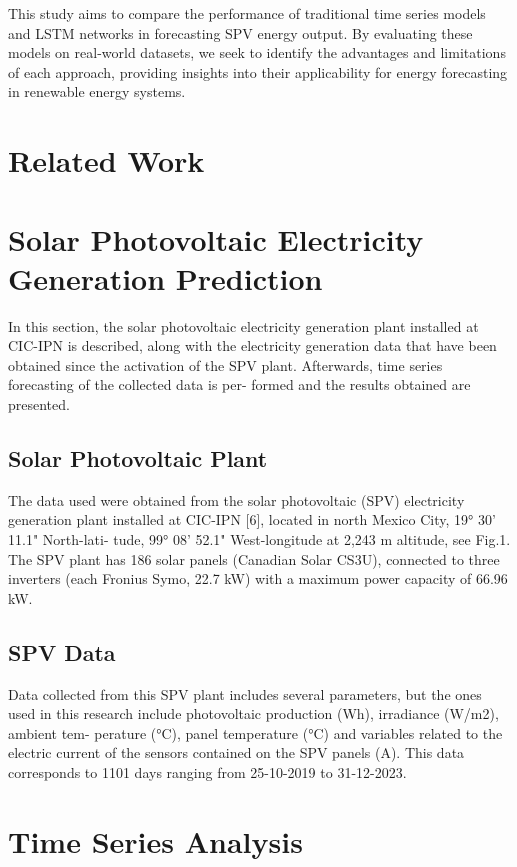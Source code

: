 \documentclass[a4paper,12pt]{article}
\begin{document}
This study aims to compare the performance of traditional time series models and LSTM networks in forecasting SPV energy output. By evaluating these models on real-world datasets, we seek to identify the advantages and limitations of each approach, providing insights into their applicability for energy forecasting in renewable energy systems.

\section{Related Work}

\section{Solar Photovoltaic Electricity Generation Prediction}
In this section, the solar photovoltaic electricity generation plant installed at CIC-IPN
is described, along with the electricity generation data that have been obtained since the
activation of the SPV plant. Afterwards, time series forecasting of the collected data is per-
formed and the results obtained are presented.

\subsection{Solar Photovoltaic Plant}
The data used were obtained from the solar photovoltaic (SPV) electricity generation
plant installed at CIC-IPN [6], located in north Mexico City, 19° 30' 11.1" North-lati-
tude, 99° 08' 52.1" West-longitude at 2,243 m altitude, see Fig.1. The SPV plant has
186 solar panels (Canadian Solar CS3U), connected to three inverters (each Fronius
Symo, 22.7 kW) with a maximum power capacity of 66.96 kW.

\subsection{SPV Data}
Data collected from this SPV plant includes several parameters, but the ones used in
this research include photovoltaic production (Wh), irradiance (W/m2), ambient tem-
perature (°C), panel temperature (°C) and variables related to the electric current of the sensors contained on the SPV panels (A). This data corresponds to 1101 days ranging from 25-10-2019 to 31-12-2023.

\section{Time Series Analysis}
\end{document}
